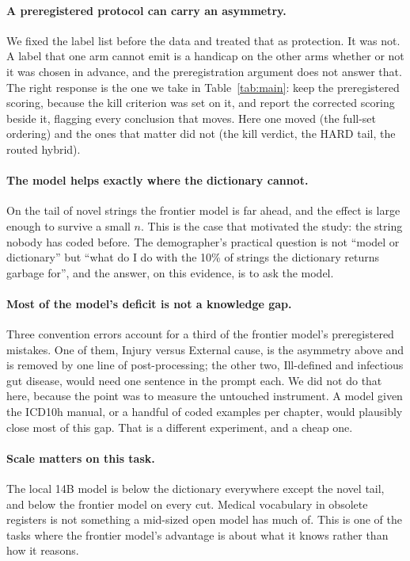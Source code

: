 \documentclass[11pt]{article}
\begin{document}
\paragraph{A preregistered protocol can carry an asymmetry.} We fixed the label list before the data and treated that as protection. It was not. A label that one arm cannot emit is a handicap on the other arms whether or not it was chosen in advance, and the preregistration argument does not answer that. The right response is the one we take in Table~\ref{tab:main}: keep the preregistered scoring, because the kill criterion was set on it, and report the corrected scoring beside it, flagging every conclusion that moves. Here one moved (the full-set ordering) and the ones that matter did not (the kill verdict, the HARD tail, the routed hybrid).

\paragraph{The model helps exactly where the dictionary cannot.} On the tail of novel strings the frontier model is far ahead, and the effect is large enough to survive a small $n$. This is the case that motivated the study: the string nobody has coded before. The demographer's practical question is not ``model or dictionary'' but ``what do I do with the 10\% of strings the dictionary returns garbage for'', and the answer, on this evidence, is to ask the model.

\paragraph{Most of the model's deficit is not a knowledge gap.} Three convention errors account for a third of the frontier model's preregistered mistakes. One of them, Injury versus External cause, is the asymmetry above and is removed by one line of post-processing; the other two, Ill-defined and infectious gut disease, would need one sentence in the prompt each. We did not do that here, because the point was to measure the untouched instrument. A model given the ICD10h manual, or a handful of coded examples per chapter, would plausibly close most of this gap. That is a different experiment, and a cheap one.

\paragraph{Scale matters on this task.} The local 14B model is below the dictionary everywhere except the novel tail, and below the frontier model on every cut. Medical vocabulary in obsolete registers is not something a mid-sized open model has much of. This is one of the tasks where the frontier model's advantage is about what it knows rather than how it reasons.
\end{document}
